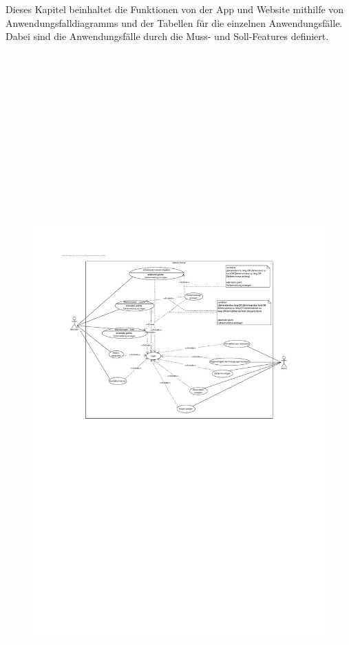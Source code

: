 Dieses Kapitel beinhaltet die Funktionen von der App und Website mithilfe von Anwendungsfalldiagramms und der Tabellen für die einzelnen Anwendungsfälle.
Dabei sind die Anwendungsfälle durch die Muss- und Soll-Features definiert.
\begin{figure}[H]

	\hspace{-5cm}
	\includegraphics[width=25 cm, height = 40cm]{./img/mustCase}
\end{figure}


